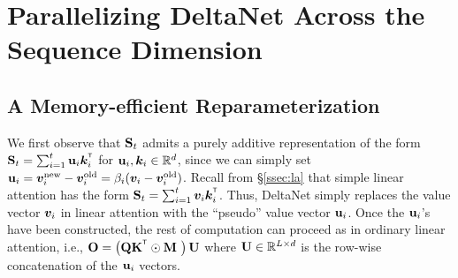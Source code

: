 \vspace{-2mm}
\section{Parallelizing DeltaNet Across the Sequence Dimension}


\vspace{-2mm}
\subsection{A Memory-efficient Reparameterization}
\label{ssec:wy}
\vspace{-2mm}

We first observe that  ${\mathbf{S}}_t$ admits a purely additive representation of the form $\rmS_t = \sum_{i=1}^t \vu_i \vk_i^\intercal$ for $\mathbf{u}_i, {\bm{k}}_i \in \mathbb{R}^{d}$, since we can simply set $\mathbf{u}_i = {\bm{v}}_i^{\text{new}} - {\bm{v}}_i^{\text{old}} = \beta_i({\bm{v}}_i - {\bm{v}}_i^\text{old})$.
Recall from \S\ref{ssec:la} that simple linear attention has the form $\rmS_t = \sum_{i=1}^t \vv_i\vk_i^\intercal$. Thus, DeltaNet simply replaces the value vector ${\bm{v}}_i$ in linear attention with the ``pseudo'' value vector $\mathbf{u}_i$.
Once the $\mathbf{u}_i$'s have been constructed, the rest of computation can proceed  as in ordinary linear attention, i.e., $\rmO = \left(\rmQ \rmK^\intercal \odot \rmM \ \right ) \rmU$ where ${\mathbf{U}} \in \mathbb{R}^{L \times d}$ is the row-wise concatenation of the $\mathbf{u}_i$ vectors.

